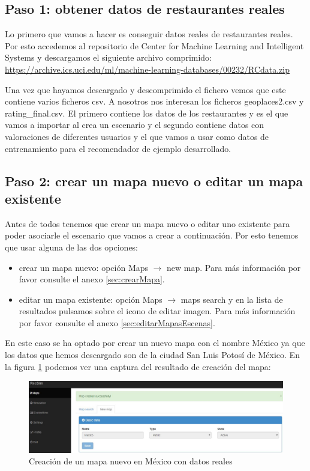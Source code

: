 \subsection{Paso 1: obtener datos de restaurantes reales}

Lo primero que vamos a hacer es conseguir datos reales de restaurantes reales. Por esto accedemos al repositorio de Center for Machine Learning and Intelligent Systems y descargamos el siguiente archivo comprimido: \href{https://archive.ics.uci.edu/ml/machine-learning-databases/00232/RCdata.zip}{https://archive.ics.uci.edu/ml/machine-learning-databases/00232/RCdata.zip}

Una vez que hayamos descargado y descomprimido el fichero vemos que este contiene varios ficheros csv. A nosotros nos interesan los ficheros geoplaces2.csv y rating\_final.csv. El primero contiene los datos de los restaurantes y es el que vamos a importar al crea un escenario y el segundo contiene datos con valoraciones de diferentes usuarios y el que vamos a usar como datos de entrenamiento para el recomendador de ejemplo desarrollado.

\subsection{Paso 2: crear un mapa nuevo o editar un mapa existente}

Antes de todos tenemos que crear un mapa nuevo o editar uno existente para poder asociarle el escenario que vamos a crear a continuación. Por esto tenemos que usar alguna de las dos opciones:
\begin{itemize}
	\item crear un mapa nuevo: opción  Maps $\rightarrow$ new map. Para más información por favor consulte el anexo \ref{sec:crearMapa}.
	\item editar un mapa existente: opción Maps $\rightarrow$ maps search y en la lista de resultados pulsamos sobre el icono de editar imagen. Para más información por favor consulte el anexo \ref{sec:editarMapasEscenas}.
\end{itemize} 

En este caso se ha optado por crear un nuevo mapa con el nombre México ya que los datos que hemos descargado son de la ciudad San Luis Potosí de México. En la figura \ref{mapaMexico} podemos ver una captura del resultado de creación del mapa:

\begin{figure}[H]
	\centering\includegraphics[scale=0.36]{imagenes/crear-mapa-nuevo-mexico.jpg}
	\caption{Creación de un mapa nuevo en México con datos reales}
	\label{mapaMexico}
\end{figure}

